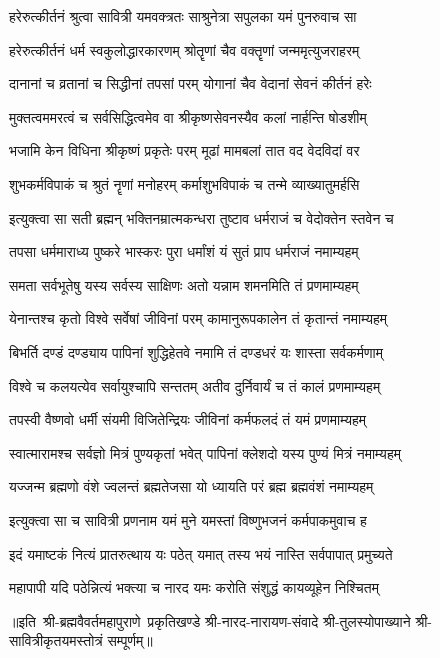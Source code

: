 

\twolineshloka
{हरेरुत्कीर्तनं श्रुत्वा सावित्री यमवक्त्रतः}
{साश्रुनेत्रा सपुलका यमं पुनरुवाच सा}%

\twolineshloka
{हरेरुत्कीर्तनं धर्म स्वकुलोद्धारकारणम्}
{श्रोतॄणां चैव वक्तॄणां जन्ममृत्युजराहरम्}%

\twolineshloka
{दानानां च व्रतानां च सिद्धीनां तपसां परम्}
{योगानां चैव वेदानां सेवनं कीर्तनं हरेः}%

\twolineshloka
{मुक्तत्वममरत्वं च सर्वसिद्धित्वमेव वा}
{श्रीकृष्णसेवनस्यैव कलां नार्हन्ति षोडशीम्}%

\twolineshloka
{भजामि केन विधिना श्रीकृष्णं प्रकृतेः परम्}
{मूढां मामबलां तात वद वेदविदां वर}%

\twolineshloka
{शुभकर्मविपाकं च श्रुतं नॄणां मनोहरम्}
{कर्माशुभविपाकं च तन्मे व्याख्यातुमर्हसि}%

\twolineshloka
{इत्युक्त्वा सा सती ब्रह्मन् भक्तिनम्रात्मकन्धरा}
{तुष्टाव धर्मराजं च वेदोक्तेन स्तवेन च}%

\twolineshloka
{तपसा धर्ममाराध्य पुष्करे भास्करः पुरा}
{धर्मांशं यं सुतं प्राप धर्मराजं नमाम्यहम्}%

\twolineshloka
{समता सर्वभूतेषु यस्य सर्वस्य साक्षिणः}
{अतो यन्नाम शमनमिति तं प्रणमाम्यहम्}%

\twolineshloka
{येनान्तश्च कृतो विश्वे सर्वेषां जीविनां परम्}
{कामानुरूपकालेन तं कृतान्तं नमाम्यहम्}%

\twolineshloka
{बिभर्ति दण्डं दण्ड्याय पापिनां शुद्धिहेतवे}
{नमामि तं दण्डधरं यः शास्ता सर्वकर्मणाम्}%

\twolineshloka
{विश्वे च कलयत्येव सर्वायुश्चापि सन्ततम्}
{अतीव दुर्निवार्यं च तं कालं प्रणमाम्यहम्}%

\twolineshloka
{तपस्वी वैष्णवो धर्मी संयमी विजितेन्द्रियः}
{जीविनां कर्मफलदं तं यमं प्रणमाम्यहम्}%

\twolineshloka
{स्वात्मारामश्च सर्वज्ञो मित्रं पुण्यकृतां भवेत्}
{पापिनां क्लेशदो यस्य पुण्यं मित्रं नमाम्यहम्}%

\twolineshloka
{यज्जन्म ब्रह्मणो वंशे ज्वलन्तं ब्रह्मतेजसा}
{यो ध्यायति परं ब्रह्म ब्रह्मवंशं नमाम्यहम्}%

\twolineshloka
{इत्युक्त्वा सा च सावित्री प्रणनाम यमं मुने}
{यमस्तां विष्णुभजनं कर्मपाकमुवाच ह}%

\twolineshloka
{इदं यमाष्टकं नित्यं प्रातरुत्थाय यः पठेत्}
{यमात् तस्य भयं नास्ति सर्वपापात् प्रमुच्यते}%

\twolineshloka
{महापापी यदि पठेन्नित्यं भक्त्या च नारद}
{यमः करोति संशुद्धं कायव्यूहेन निश्चितम्}%

{॥इति~श्री-ब्रह्मवैवर्तमहापुराणे~प्रकृतिखण्डे श्री-नारद-नारायण-संवादे श्री-तुलस्योपाख्याने श्री-सावित्रीकृतयमस्तोत्रं सम्पूर्णम्॥}